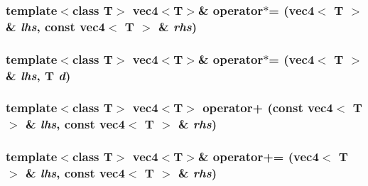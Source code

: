 \hypertarget{classnv_1_1vec4_db31e94e1ef43e088572ee682aa5ab6c}{
\subsubsection[{operator$\ast$=}]{\setlength{\rightskip}{0pt plus 5cm}template$<$class T$>$ {\bf vec4}$<$T$>$\& operator$\ast$= ({\bf vec4}$<$ T $>$ \& {\em lhs}, \/  const {\bf vec4}$<$ T $>$ \& {\em rhs})}}
\label{classnv_1_1vec4_db31e94e1ef43e088572ee682aa5ab6c}


\hypertarget{classnv_1_1vec4_e65c5a39b3a0919fbd11005040b83d93}{
\subsubsection[{operator$\ast$=}]{\setlength{\rightskip}{0pt plus 5cm}template$<$class T$>$ {\bf vec4}$<$T$>$\& operator$\ast$= ({\bf vec4}$<$ T $>$ \& {\em lhs}, \/  T {\em d})}}
\label{classnv_1_1vec4_e65c5a39b3a0919fbd11005040b83d93}


\hypertarget{classnv_1_1vec4_5ddc069514681de9e350c3f082431fd7}{
\subsubsection[{operator+}]{\setlength{\rightskip}{0pt plus 5cm}template$<$class T$>$ {\bf vec4}$<$T$>$ operator+ (const {\bf vec4}$<$ T $>$ \& {\em lhs}, \/  const {\bf vec4}$<$ T $>$ \& {\em rhs})}}
\label{classnv_1_1vec4_5ddc069514681de9e350c3f082431fd7}


\hypertarget{classnv_1_1vec4_bea67e054b76ea133d0b20187cb6da7e}{
\subsubsection[{operator+=}]{\setlength{\rightskip}{0pt plus 5cm}template$<$class T$>$ {\bf vec4}$<$T$>$\& operator+= ({\bf vec4}$<$ T $>$ \& {\em lhs}, \/  const {\bf vec4}$<$ T $>$ \& {\em rhs})}}
\label{classnv_1_1vec4_bea67e054b76ea133d0b20187cb6da7e}


